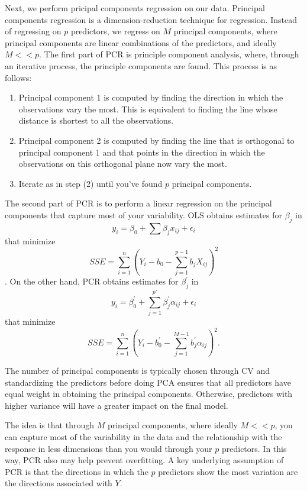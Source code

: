 \documentclass{article}
\begin{document}
Next, we perform pricipal components regression on our data. Principal components regression is a dimension-reduction technique for regression. Instead of regressing on $p$ predictors, we regress on $M$ principal components, where principal components are linear combinations of the predictors, and ideally $M<<p$. The first part of PCR is principle component analysis, where, through an iterative process, the principle components are found. This process is as follows: 

\begin{enumerate}
\item Principal component 1 is computed by finding the direction in which the observations vary the most. This is equivalent to finding the line whose distance is shortest to all the observations. 
\item Principal component 2 is computed by finding the line that is orthogonal to principal component 1 and that points in the direction in which the observations on this orthogonal plane now vary the most. 
\item Iterate as in step (2) until you've found $p$ principal components. 
\end{enumerate}

The second part of PCR is to perform a linear regression on the principal components that capture most of your variability. OLS obtains estimates for $\beta_j$ in $$y_i = \beta_0 + \sum \beta_jx_{ij} + \epsilon_i$$ that minimize $$SSE = \sum_{i=1}^{n}\left(Y_i - b_0 - \sum_{j=1}^{p-1}b_jX_{ij}\right)^2$$. On the other hand, PCR obtains estimates for $\beta_j^\prime$ in $$y_i = \beta_0^\prime + \sum_{j=1}^{p\prime}\beta_j^\prime \alpha_{ij} + \epsilon_i$$ that minimize $$SSE = \sum_{i=1}^{n}\left(Y_i - b_0^\prime - \sum_{j=1}^{M-1}b_j^\prime \alpha_{ij}\right)^2 .$$

The number of principal components is typically chosen through CV and standardizing the predictors before doing PCA ensures that all predictors have equal weight in obtaining the principal components. Otherwise, predictors with higher variance will have a greater impact on the final model.

The idea is that through $M$ principal components, where ideally $M<<p$, you can capture most of the variability in the data and the relationship with the response in less dimensions than you would through your $p$ predictors. In this way, PCR also may help prevent overfitting. A key underlying assumption of PCR is that the directions in which the $p$ predictors show the most variation are the directions associated with $Y$. 
\end{document}
